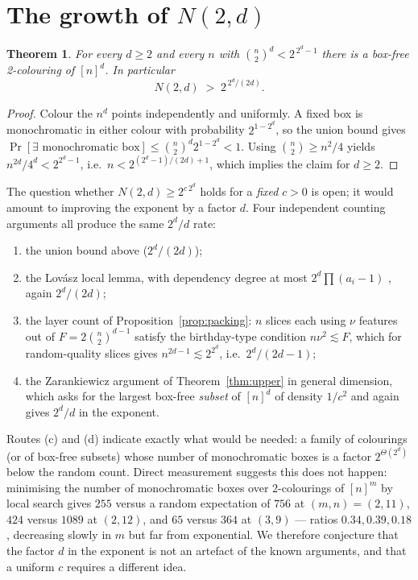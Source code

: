\documentclass[11pt]{article}
\newtheorem{theorem}{Theorem}
\theoremstyle{definition}
\begin{document}
\section{The growth of \texorpdfstring{$N(2,d)$}{N(2,d)}}\label{sec:growth}

\begin{theorem}\label{thm:random}
For every $d\ge2$ and every $n$ with $\binom{n}{2}^{d}<2^{\,2^d-1}$ there is a box-free
2-colouring of $[n]^d$. In particular
\[
N(2,d)\;>\;2^{\,2^d/(2d)} .
\]
\end{theorem}

\begin{proof}
Colour the $n^d$ points independently and uniformly. A fixed box is monochromatic in
either colour with probability $2^{1-2^d}$, so the union bound gives
$\Pr[\exists\text{ monochromatic box}]\le\binom{n}{2}^d 2^{1-2^d}<1$. Using
$\binom{n}{2}\ge n^2/4$ yields $n^{2d}/4^d<2^{2^d-1}$, i.e.\
$n<2^{(2^d-1)/(2d)+1}$, which implies the claim for $d\ge2$.
\end{proof}

The question whether $N(2,d)\ge 2^{c\,2^d}$ holds for a \emph{fixed} $c>0$ is open; it
would amount to improving the exponent by a factor $d$. Four independent counting
arguments all produce the same $2^d/d$ rate:
\begin{enumerate}[label=(\alph*)]
\item the union bound above ($2^d/(2d)$);
\item the Lov\'asz local lemma, with dependency degree at most
  $2^d\prod(a_i-1)$ \cite[Thm.~2]{CFP}, again $2^d/(2d)$;
\item the layer count of Proposition~\ref{prop:packing}: $n$ slices each using $\nu$
  features out of $F=2\binom{n}{2}^{d-1}$ satisfy the birthday-type condition
  $n\nu^2\lesssim F$, which for random-quality slices gives $n^{2d-1}\lesssim2^{2^d}$,
  i.e.\ $2^d/(2d-1)$;
\item the Zarankiewicz argument of Theorem~\ref{thm:upper} in general dimension, which
  asks for the largest box-free \emph{subset} of $[n]^d$ of density $1/c^2$ and again
  gives $2^d/d$ in the exponent.
\end{enumerate}
Routes (c) and (d) indicate exactly what would be needed: a family of colourings (or of
box-free subsets) whose number of monochromatic boxes is a factor $2^{\Theta(2^d)}$
below the random count. Direct measurement suggests this does not happen: minimising the
number of monochromatic boxes over 2-colourings of $[n]^m$ by local search gives
$255$ versus a random expectation of $756$ at $(m,n)=(2,11)$, $424$ versus $1089$ at
$(2,12)$, and $65$ versus $364$ at $(3,9)$ --- ratios $0.34,0.39,0.18$, decreasing slowly
in $m$ but far from exponential. We therefore conjecture that the factor $d$ in the
exponent is not an artefact of the known arguments, and that a uniform $c$ requires a
different idea.
\end{document}
